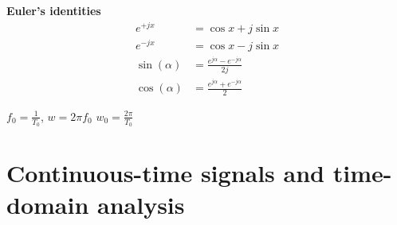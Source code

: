 \documentclass{article}
\begin{document}
\noindent\textbf{Euler's identities}
\begin{align*}
  e^{+jx} &= \cos{x} + j\sin{x} \\
  e^{-jx} &= \cos{x} - j\sin{x} \\
  \sin(\alpha) &= \frac{e^{j\alpha}-e^{-j\alpha}}{2j} \\
  \cos(\alpha) &= \frac{e^{j\alpha}+e^{-j\alpha}}{2}
\end{align*}

$f_0=\frac{1}{T_0}$, $w=2\pi f_0$
$w_0=\frac{2\pi}{T_0}$

\newpage

\section{Continuous-time signals and time-domain analysis}
\end{document}
